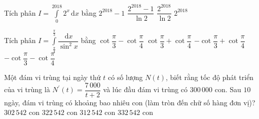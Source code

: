 \begin{ex}%
    Tích phân $I=\displaystyle\int\limits_0^{2018} 2^x \mathrm{\,d} x$ bằng
    \choice 
        {$2^{2018}-1$}
        {$\dfrac{2^{2018}-1}{\ln 2}$}
        {$\dfrac{2^{2018}}{\ln 2}$}
        {\True $2^{2018}$}
\end{ex}

\begin{ex}%
    Tích phân $I=\displaystyle\int\limits_{\frac{\pi}{4}}^{\frac{\pi}{3}} \dfrac{\mathrm{\,d} x}{\sin ^2 x}$ bằng
    \choice
    {$\cot \dfrac{\pi}{3}-\cot \dfrac{\pi}{4}$}
    {$\cot \dfrac{\pi}{3}+\cot \dfrac{\pi}{4}$}
    {\True $-\cot \dfrac{\pi}{3}+\cot \dfrac{\pi}{4}$}
    {$-\cot \dfrac{\pi}{3}-\cot \dfrac{\pi}{4}$}
\end{ex}
\begin{ex}%
    Một đám vi trùng tại ngày thứ $t$ có số lượng $N(t)$, biết rằng tốc độ phát triển của vi trùng là $N^{\prime}(t)=\dfrac{7\,000}{t+2}$ và lúc đầu đám vi trùng có $300\,000$ con. Sau $10$ ngày, đám vi trùng có khoảng bao nhiêu con (làm tròn đến chữ số hàng đơn vị)?
    \choice 
        {$302\,542$ con}
        {$322\,542$ con}
        {\True $312\,542$ con}
        {$332\,542$ con}
\end{ex}

